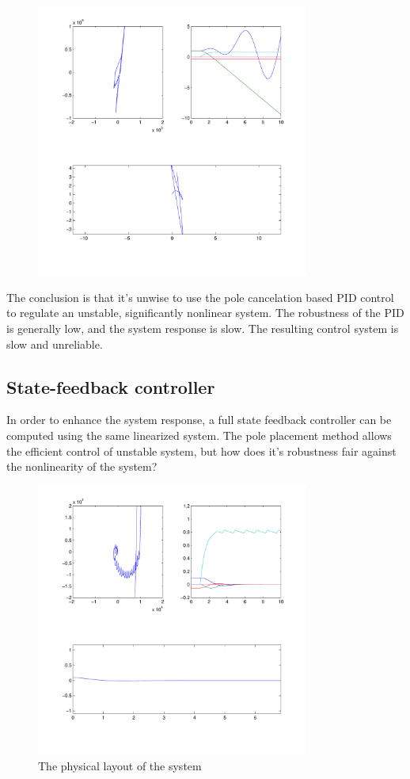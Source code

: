 \begin{figure}[H]
	\centering
	\includegraphics[width=0.8\textwidth]{img2/PI11}
	\caption{}
	\label{}
\end{figure}

The conclusion is that it’s unwise to use the pole cancelation based PID control to regulate an unstable, significantly nonlinear system. The robustness of the PID is generally low, and the system response is slow. The resulting control system is slow and unreliable.

\subsection{State-feedback controller}
In order to enhance the system response, a full state feedback controller can be computed using the same linearized system. The pole placement method allows the efficient control of unstable system, but how does it’s robustness fair against the nonlinearity of the system?

\begin{figure}[H]
	\centering
	\includegraphics[width=0.8\textwidth]{img2/Lin01}
	\caption{The physical layout of the system}
	\label{fig:PhysicalLayout}
\end{figure}

